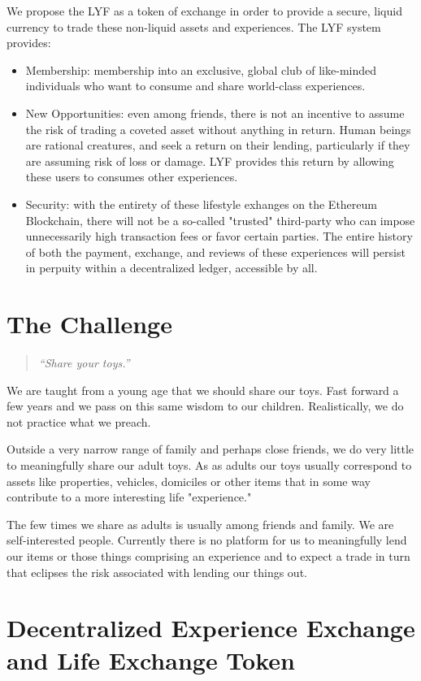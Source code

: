 \documentclass[11pt]{article}
\begin{document}
We propose the \textrm{LYF} as a token of exchange in order to provide a secure, liquid currency to trade these non-liquid assets and experiences. The \textrm{LYF} system provides: 
\begin{itemize}
\item{Membership: membership into an exclusive, global club of like-minded individuals who want to consume and share world-class experiences. }
\item{New Opportunities: even among friends, there is not an incentive to assume the risk of trading a coveted asset without anything in return. Human beings are rational creatures, and seek a return on their lending, particularly if they are assuming risk of loss or damage. LYF provides this return by allowing these users to consumes other experiences. }
\item{Security: with the entirety of these lifestyle exhanges on the Ethereum Blockchain, there will not be a so-called "trusted" third-party who can impose unnecessarily high transaction fees or favor certain parties. The entire history of both the payment, exchange, and reviews of these experiences will persist in perpuity within a decentralized ledger, accessible by all.}
\end{itemize}
\section{The Challenge}
\label{sec-3}

\begin{quote}
\textit{``Share your toys.''}
\end{quote}
We are taught from a young age that we should share our toys. Fast forward a few years and we pass on this same wisdom to our children. Realistically, we do not practice what we preach.

Outside a very narrow range of family and perhaps close friends, we do very little to meaningfully share our adult toys. As as adults our toys usually correspond to assets like properties, vehicles, domiciles or other items that in some way contribute to a more interesting life "experience."

The few times we share as adults is usually among friends and family. We are self-interested people. Currently there is no platform for us to meaningfully lend our items or those things comprising an experience and to expect a trade in turn that eclipses the risk associated with lending our things out. 
\section{Decentralized Experience Exchange and Life Exchange Token}
\label{sec-4}
\end{document}
